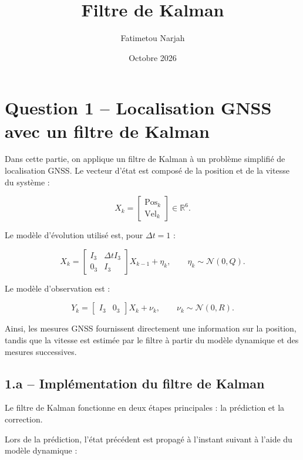 \documentclass[a4paper,12pt]{article}
\title{Filtre de Kalman}
\author{Fatimetou Narjah}
\date{Octobre 2026}
\begin{document}
\maketitle

\section{Question 1 -- Localisation GNSS avec un filtre de Kalman}

Dans cette partie, on applique un filtre de Kalman à un problème
simplifié de localisation GNSS. Le vecteur d'état est composé de la
position et de la vitesse du système :

\begin{equation}
X_k =
\begin{bmatrix}
\mathrm{Pos}_k\\
\mathrm{Vel}_k
\end{bmatrix}
\in \mathbb{R}^6.
\end{equation}

Le modèle d'évolution utilisé est, pour $\Delta t = 1$ :

\begin{equation}
X_k =
\begin{bmatrix}
I_3 & \Delta t I_3\\
0_3 & I_3
\end{bmatrix}
X_{k-1} + \eta_k,
\qquad
\eta_k \sim \mathcal{N}(0,Q).
\end{equation}

Le modèle d'observation est :

\begin{equation}
Y_k =
\begin{bmatrix}
I_3 & 0_3
\end{bmatrix}
X_k + \nu_k,
\qquad
\nu_k \sim \mathcal{N}(0,R).
\end{equation}

Ainsi, les mesures GNSS fournissent directement une information sur
la position, tandis que la vitesse est estimée par le filtre à partir
du modèle dynamique et des mesures successives.


\subsection{1.a -- Implémentation du filtre de Kalman}

Le filtre de Kalman fonctionne en deux étapes principales : la
prédiction et la correction.

Lors de la prédiction, l'état précédent est propagé à l'instant
suivant à l'aide du modèle dynamique :
\end{document}
